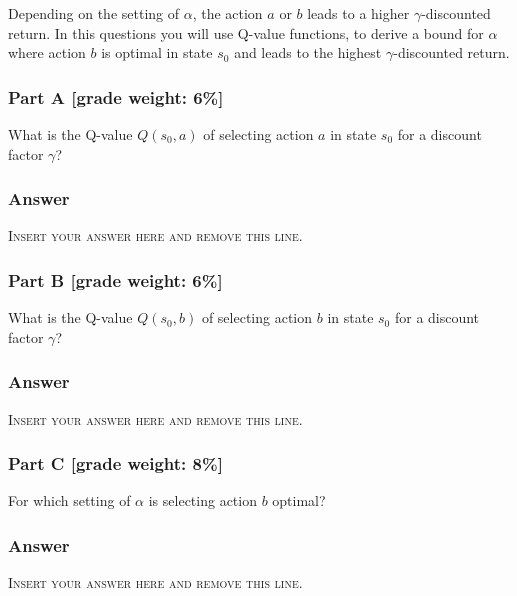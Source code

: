 \documentclass{article}
\begin{document}
Depending on the setting of $\alpha$, the action $a$ or $b$ leads to a higher $\gamma$-discounted return.
In this questions you will use Q-value functions, to derive a bound for $\alpha$ where action $b$ is optimal in state $s_0$ and leads to the highest $\gamma$-discounted return.

\subsubsection*{Part A [grade weight: 6\%]}
What is the Q-value $Q(s_0,a)$ of selecting action $a$ in state $s_0$ for a discount factor $\gamma$?

\subsubsection*{Answer}
\noindent\textsc{Insert your answer here and remove this line.}

\subsubsection*{Part B [grade weight: 6\%]}
What is the Q-value $Q(s_0,b)$ of selecting action $b$ in state $s_0$ for a discount factor $\gamma$?

\subsubsection*{Answer}
\noindent\textsc{Insert your answer here and remove this line.}

\subsubsection*{Part C [grade weight: 8\%]}
For which setting of $\alpha$ is selecting action $b$ optimal?

\subsubsection*{Answer}
\noindent\textsc{Insert your answer here and remove this line.}
\end{document}
